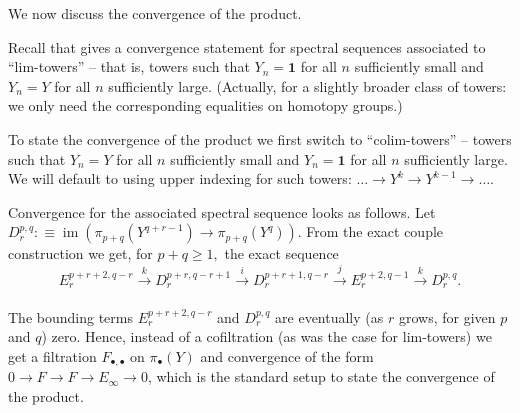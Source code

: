 \documentclass{amsart}
\theoremstyle{definition}
\newcommand{\im}{\operatorname{im}}
\newcommand{\sgtn}{\mathbf{1}}
\begin{document}
We now discuss the convergence of the product.

    Recall that \cite{Flo} gives a convergence statement for spectral sequences associated to ``lim-towers'' -- that is, towers such that $Y_n = \sgtn$ for all $n$ sufficiently small and $Y_n = Y$ for all $n$ sufficiently large. (Actually, for a slightly broader class of towers: we only need the corresponding equalities on homotopy groups.)

    To state the convergence of the product we first switch to ``colim-towers'' -- towers such that $Y_n = Y$ for all $n$ sufficiently small and $Y_n = \sgtn$ for all $n$ sufficiently large. We will default to using upper indexing for such towers: $\ldots \to Y^k \to Y^{k-1} \to \ldots $.

    Convergence for the associated spectral sequence looks as follows. Let $D_r^{p,q} :\equiv \im (\pi_{p+q}(Y^{q+r-1}) \to \pi_{p+q}(Y^{q}))$. From the exact couple construction we get, for $p+q \geq 1,$ the exact sequence
    $$E_r^{p+r+2, q-r} \xrightarrow{k} D_r^{p+r, q-r+1} \xrightarrow{i} D_r^{p+r+1, q-r} \xrightarrow{j} E_r^{p+2,q-1} \xrightarrow{k} D_r^{p,q}.$$
    \\The bounding terms $E_r^{p+r+2, q-r}$ and $D_r^{p,q}$ are eventually (as $r$ grows, for given $p$ and $q$) zero. Hence, instead of a cofiltration (as was the case for lim-towers) we get a filtration $F_{\bullet, \bullet}$ on $\pi_\bullet(Y)$ and convergence of the form $0 \to F \to F \to E_\infty \to 0$, which is the standard setup to state the convergence of the product.
\end{document}
